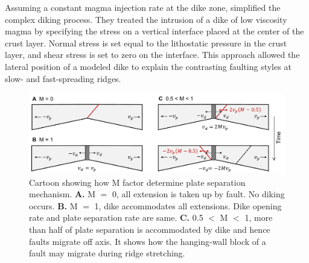 \documentclass[letterpaper,12pt,notitle]{memphisthesis}                     %
\begin{document}
Assuming a constant magma injection rate at the dike zone, \citet{Buck1998} simplified the complex diking process. They treated the intrusion of a dike of low viscosity magma by specifying the stress on a vertical interface placed at the center of the crust layer. Normal stress is set equal to the lithostatic pressure in the crust layer, and shear stress is set to zero on the interface.
This approach allowed the lateral position of a modeled dike to explain the contrasting faulting styles at slow- and fast-spreading ridges.

\begin{figure}[!htb]
    \centering
    \includegraphics[width=0.99\linewidth]{./figs/mfactor.pdf}
    \caption{Cartoon showing how M factor determine plate separation mechanism. \textbf{A.} M $=$ 0, all extension is taken up by fault. No diking occurs. \textbf{B.} M $=$ 1, dike accommodates all extensions. Dike opening rate and plate separation rate are same. \textbf{C.} 0.5 $<$ M $<$ 1, more than half of plate separation is accommodated by dike and hence faults migrate off axis. It shows how the hanging-wall block of a fault may migrate during ridge stretching.}
    \label{fig:mcartoon}
\end{figure}
\end{document}
